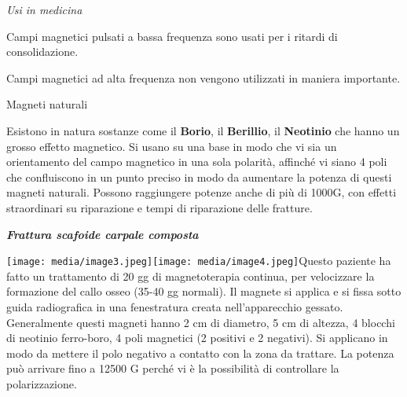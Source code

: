 \documentclass[]{article}
\begin{document}
\emph{Usi in medicina }

Campi magnetici pulsati a bassa frequenza sono usati per i ritardi di
consolidazione.

Campi magnetici ad alta frequenza non vengono utilizzati in maniera
importante.

Magneti naturali

Esistono in natura sostanze come il \textbf{Borio}, il
\textbf{Berillio}, il \textbf{Neotinio} che hanno un grosso effetto
magnetico. Si usano su una base in modo che vi sia un orientamento del
campo magnetico in una sola polarità, affinché vi siano 4 poli che
confluiscono in un punto preciso in modo da aumentare la potenza di
questi magneti naturali. Possono raggiungere potenze anche di più di
1000G, con effetti straordinari su riparazione e tempi di riparazione
delle fratture.

\textbf{\emph{Frattura scafoide carpale composta}}

\texttt{[image: media/image3.jpeg]}\texttt{[image: media/image4.jpeg]}Questo
paziente ha fatto un trattamento di 20 gg di magnetoterapia continua,
per velocizzare la formazione del callo osseo (35-40 gg normali). Il
magnete si applica e si fissa sotto guida radiografica in una
fenestratura creata nell'apparecchio gessato. Generalmente questi
magneti hanno 2 cm di diametro, 5 cm di altezza, 4 blocchi di neotinio
ferro-boro, 4 poli magnetici (2 positivi e 2 negativi). Si applicano in
modo da mettere il polo negativo a contatto con la zona da trattare. La
potenza può arrivare fino a 12500 G perché vi è la possibilità di
controllare la polarizzazione.
\end{document}
